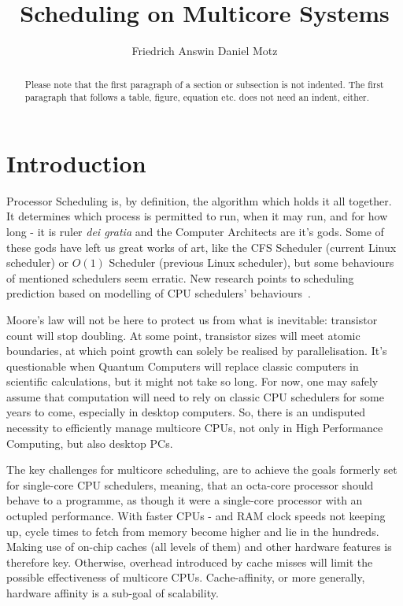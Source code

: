 \documentclass[runningheads]{llncs}
\begin{document}
%
\title{Scheduling on Multicore Systems}
%
%
\author{Friedrich Answin Daniel Motz}
%
%
%
\maketitle              %
%
\begin{abstract}
Please note that the first paragraph of a section or subsection is
not indented. The first paragraph that follows a table, figure,
equation etc. does not need an indent, either.

\end{abstract}
%
%
%
\section{Introduction}
Processor Scheduling is, by definition, the algorithm which holds it all together. It determines which
process is permitted to run, when it may run, and for how long - it is ruler \textit{dei gratia}
and the Computer Architects are it's gods. Some of these gods have left us great works of art,
like the CFS Scheduler (current Linux scheduler) or $O(1)$ Scheduler (previous Linux scheduler), 
but some behaviours of mentioned schedulers seem erratic. New research points to scheduling prediction 
based on modelling of CPU schedulers' behaviours~\cite{meehean}.

Moore's law will not be here to protect us from what is inevitable: transistor count will stop
doubling. At some point, transistor sizes will meet atomic boundaries, at which point growth can
solely be realised by parallelisation. It's questionable when Quantum Computers
will replace classic computers in scientific calculations, but it might not take so long. For
now, one may safely assume that computation will need to rely on classic CPU schedulers for some
years to come, especially in desktop computers. So, there is an undisputed necessity to efficiently
manage multicore CPUs, not only in High Performance Computing, but also desktop PCs.~\cite{thread-sched-mc-platforms}

The key challenges for multicore scheduling, are to achieve the goals formerly set for single-core
CPU schedulers, meaning, that an octa-core processor should behave to a programme, as though it 
were a single-core processor with an octupled performance. With faster CPUs - and RAM clock speeds not
keeping up, cycle times to fetch from memory become higher and lie in the hundreds.~\cite{fedorova-phd}
Making use of on-chip caches (all levels of them) and other hardware features is therefore key.
Otherwise, overhead introduced by cache misses will limit the possible effectiveness of multicore
CPUs. Cache-affinity, or more generally, hardware affinity is a sub-goal of scalability.
\end{document}

